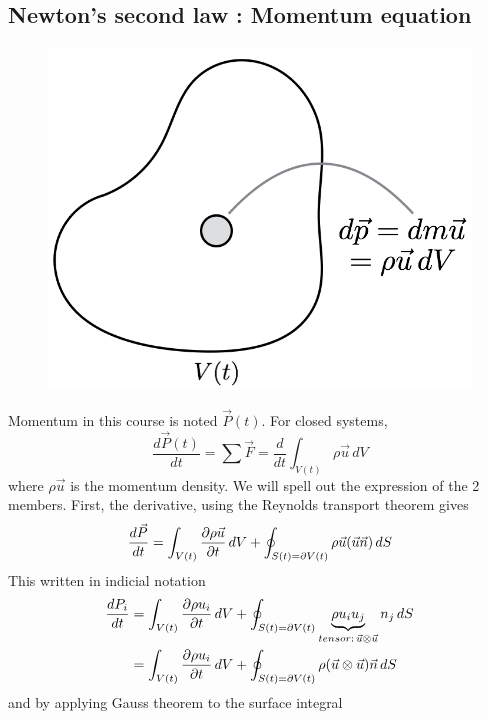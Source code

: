 	\subsection{Newton's second law : Momentum equation}
	\begin{figure}
	\vspace{-5mm}
	\includegraphics[scale=0.3]{ch1/4}
	\label{fig:1.4}
	\end{figure}
	Momentum in this course is noted $\vec{P}(t)$. For closed systems,
	\begin{equation}
		\frac{d\vec{P}(t)}{dt} = \sum \vec{F} = \frac{d}{dt}\int _{V(t)} \rho \vec{u}\, dV
		\label{eq:1.18}
	\end{equation}
	where $\rho \vec{u}$ is the momentum density. We will spell out the expression of the 2 members. First, the derivative, using the Reynolds transport theorem gives 
	\begin{equation}
		\frac{d\vec{P}}{dt} = \int _{V(t)} \frac{\D \rho \vec{u}}{\D t}\, dV + \oint _{S(t) = \D V(t)} \rho \vec{u} (\vec{u} \vec{n}) \, dS
	\end{equation}
	This written in indicial notation
	\begin{equation}
	\begin{aligned}
		\frac{dP_i}{dt} &= \int _{V(t)} \frac{\D \rho u_i}{\D t}\, dV + \oint _{S(t) = \D V(t)} \underbrace{\rho u_i u_j}_{tensor :\, \vec{u} \otimes \vec{u}} n_j \, dS\\
		&= \int _{V(t)} \frac{\D \rho u_i}{\D t}\, dV + \oint _{S(t) = \D V(t)} \rho (\vec{u} \otimes \vec{u}) \vec{n}\, dS 
		\end{aligned}
	\end{equation}
	and by applying Gauss theorem to the surface integral

